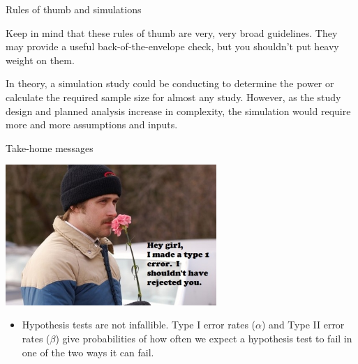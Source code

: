 \documentclass[ignorenonframetext,]{beamer}
\begin{document}
\begin{frame}{Rules of thumb and simulations}

Keep in mind that these rules of thumb are very, very broad guidelines.
They may provide a useful back-of-the-envelope check, but you shouldn't
put heavy weight on them.

In theory, a simulation study could be conducting to determine the power
or calculate the required sample size for almost any study. However, as
the study design and planned analysis increase in complexity, the
simulation would require more and more assumptions and inputs.

\end{frame}

\begin{frame}{Take-home messages}

\begin{center}\includegraphics[width=0.6\textwidth]{images/type_I_error} \end{center}

\begin{itemize}
  \item Hypothesis tests are not infallible. Type I error rates ($\alpha$) and Type II error rates ($\beta$) give probabilities of how often we expect a hypothesis test to fail in one of the two ways it can fail.
\end{itemize}

\end{frame}
\end{document}
